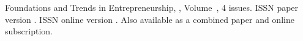 \journallibraryinfo
 {%
  Foundations and Trends\textsuperscript{\textregistered} in
  Entrepreneurship, ,
  Volume~, 4 issues.
  ISSN paper version .
  ISSN online version .
  Also available as a combined paper and online
  subscription.
 } 